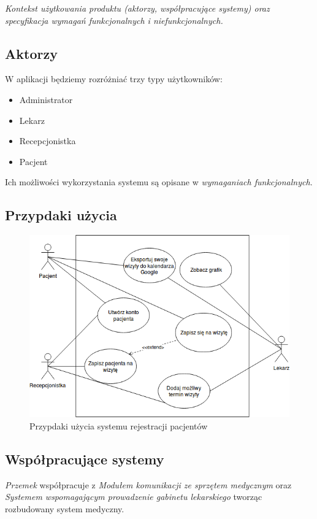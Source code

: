 \documentclass[polish,12pt]{aghthesis}
\begin{document}
\emph{Kontekst użytkowania produktu (aktorzy, współpracujące systemy)
  oraz specyfikacja wymagań funkcjonalnych i niefunkcjonalnych.}
  
\subsection{Aktorzy}
W aplikacji będziemy rozróżniać trzy typy użytkowników:
\begin{itemize}
    \item Administrator
    \item Lekarz
    \item Recepcjonistka
    \item Pacjent
\end{itemize}
Ich możliwości wykorzystania systemu są opisane w \emph{wymaganiach funkcjonalnych}. 

\subsection{Przypdaki użycia}
    \begin{figure}[H]
        \includegraphics[width=\textwidth]{use-case-v1}
        \caption{Przypdaki użycia systemu rejestracji pacjentów}
    \end{figure}
    
\subsection{Współpracujące systemy}
\emph{Przemek} współpracuje z \emph{Modułem komunikacji ze sprzętem medycznym} oraz \emph{Systemem wspomagającym prowadzenie gabinetu lekarskiego} tworząc rozbudowany system medyczny.
\end{document}
